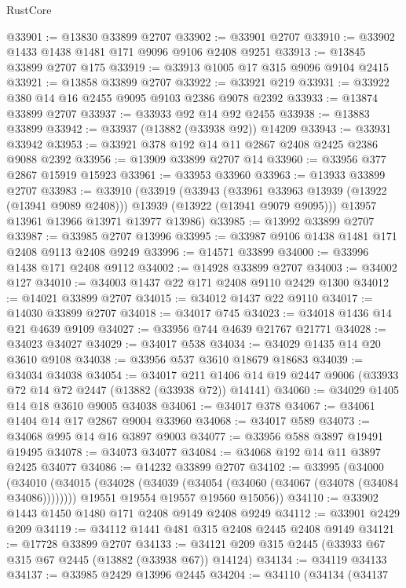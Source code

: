 \begin{lexlean}{RustCore}
\begin{coremodule}
@33901 := @13830 @33899 @2707
@33902 := @33901 @2707
@33910 := @33902 @1433 @1438 @1481 @171 @9096 @9106 @2408 @9251
@33913 := @13845 @33899 @2707 @175
@33919 := @33913 @1005 @17 @315 @9096 @9104 @2415
@33921 := @13858 @33899 @2707
@33922 := @33921 @219
@33931 := @33922 @380 @14 @16 @2455 @9095 @9103 @2386 @9078 @2392
@33933 := @13874 @33899 @2707
@33937 := @33933 @92 @14 @92 @2455
@33938 := @13883 @33899
@33942 := @33937 (@13882 (@33938 @92)) @14209
@33943 := @33931 @33942
@33953 := @33921 @378 @192 @14 @11 @2867 @2408 @2425 @2386 @9088 @2392
@33956 := @13909 @33899 @2707 @14
@33960 := @33956 @377 @2867 @15919 @15923
@33961 := @33953 @33960
@33963 := @13933 @33899 @2707
@33983 := @33910
    (@33919
      (@33943
        (@33961 @33963 @13939 (@13922 (@13941 @9089 @2408)))
        @13939
        (@13922 (@13941 @9079 @9095)))
      @13957
      @13961
      @13966
      @13971
      @13977
      @13986)
@33985 := @13992 @33899 @2707
@33987 := @33985 @2707 @13996
@33995 := @33987 @9106 @1438 @1481 @171 @2408 @9113 @2408 @9249
@33996 := @14571 @33899
@34000 := @33996 @1438 @171 @2408 @9112
@34002 := @14928 @33899 @2707
@34003 := @34002 @127
@34010 := @34003 @1437 @22 @171 @2408 @9110 @2429 @1300
@34012 := @14021 @33899 @2707
@34015 := @34012 @1437 @22 @9110
@34017 := @14030 @33899 @2707
@34018 := @34017 @745
@34023 := @34018 @1436 @14 @21 @4639 @9109
@34027 := @33956 @744 @4639 @21767 @21771
@34028 := @34023 @34027
@34029 := @34017 @538
@34034 := @34029 @1435 @14 @20 @3610 @9108
@34038 := @33956 @537 @3610 @18679 @18683
@34039 := @34034 @34038
@34054 := @34017
    @211
    @1406
    @14
    @19
    @2447
    @9006
    (@33933 @72 @14 @72 @2447 (@13882 (@33938 @72)) @14141)
@34060 := @34029 @1405 @14 @18 @3610 @9005 @34038
@34061 := @34017 @378
@34067 := @34061 @1404 @14 @17 @2867 @9004 @33960
@34068 := @34017 @589
@34073 := @34068 @995 @14 @16 @3897 @9003
@34077 := @33956 @588 @3897 @19491 @19495
@34078 := @34073 @34077
@34084 := @34068 @192 @14 @11 @3897 @2425 @34077
@34086 := @14232 @33899 @2707
@34102 := @33995
    (@34000
      (@34010
        (@34015 (@34028 (@34039 (@34054 (@34060 (@34067 (@34078 (@34084 @34086))))))))
        @19551
        @19554
        @19557
        @19560
        @15056))
@34110 := @33902 @1443 @1450 @1480 @171 @2408 @9149 @2408 @9249
@34112 := @33901 @2429 @209
@34119 := @34112 @1441 @481 @315 @2408 @2445 @2408 @9149
@34121 := @17728 @33899 @2707
@34133 := @34121 @209 @315 @2445 (@33933 @67 @315 @67 @2445 (@13882 (@33938 @67)) @14124)
@34134 := @34119 @34133
@34137 := @33985 @2429 @13996 @2445
@34204 := @34110
    (@34134
      (@34137

\end{coremodule}
\end{lexlean}
